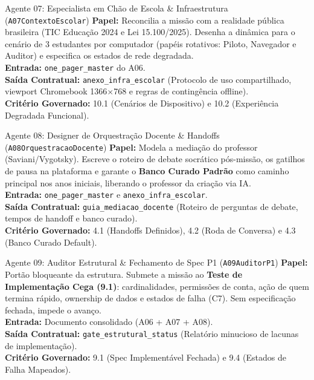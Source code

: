\documentclass[11pt,a4paper]{article}
\begin{document}
\begin{agentbox}{Agente 07: Especialista em Ch\~ao de Escola \& Infraestrutura (\texttt{A07ContextoEscolar})}
\textbf{Papel:} Reconcilia a miss\~ao com a realidade p\'ublica brasileira (TIC Educa\c{c}\~ao 2024 e Lei 15.100/2025). Desenha a din\^amica para o cen\'ario de 3 estudantes por computador (pap\'eis rotativos: Piloto, Navegador e Auditor) e especifica os estados de rede degradada.\\
\textbf{Entrada:} \texttt{one\_pager\_master} do A06.\\
\textbf{Sa\'ida Contratual:} \texttt{anexo\_infra\_escolar} (Protocolo de uso compartilhado, viewport Chromebook 1366$\times$768 e regras de conting\^encia offline).\\
\textbf{Crit\'erio Governado:} 10.1 (Cen\'arios de Dispositivo) e 10.2 (Experi\^encia Degradada Funcional).
\end{agentbox}

\begin{agentbox}{Agente 08: Designer de Orquestra\c{c}\~ao Docente \& Handoffs (\texttt{A08OrquestracaoDocente})}
\textbf{Papel:} Modela a media\c{c}\~ao do professor (Saviani/Vygotsky). Escreve o roteiro de debate socr\'atico p\'os-miss\~ao, os gatilhos de pausa na plataforma e garante o \textbf{Banco Curado Padr\~ao} como caminho principal nos anos iniciais, liberando o professor da cria\c{c}\~ao via IA.\\
\textbf{Entrada:} \texttt{one\_pager\_master} e \texttt{anexo\_infra\_escolar}.\\
\textbf{Sa\'ida Contratual:} \texttt{guia\_mediacao\_docente} (Roteiro de perguntas de debate, tempos de handoff e banco curado).\\
\textbf{Crit\'erio Governado:} 4.1 (Handoffs Definidos), 4.2 (Roda de Conversa) e 4.3 (Banco Curado Default).
\end{agentbox}

\begin{agentbox}{Agente 09: Auditor Estrutural \& Fechamento de Spec P1 (\texttt{A09AuditorP1})}
\textbf{Papel:} Port\~ao bloqueante da estrutura. Submete a miss\~ao ao \textbf{Teste de Implementa\c{c}\~ao Cega (9.1)}: cardinalidades, permiss\~oes de conta, a\c{c}\~ao de quem termina r\'apido, ownership de dados e estados de falha (C7). Sem especifica\c{c}\~ao fechada, impede o avan\c{c}o.\\
\textbf{Entrada:} Documento consolidado (A06 + A07 + A08).\\
\textbf{Sa\'ida Contratual:} \texttt{gate\_estrutural\_status} (Relat\'orio minucioso de lacunas de implementa\c{c}\~ao).\\
\textbf{Crit\'erio Governado:} 9.1 (Spec Implement\'avel Fechada) e 9.4 (Estados de Falha Mapeados).
\end{agentbox}
\end{document}
